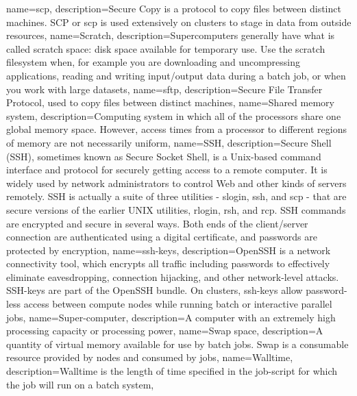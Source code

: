 {
  name={scp},
  description={Secure Copy is a protocol to copy files between distinct machines. SCP or scp is used extensively on \hpc clusters to stage in data from outside resources},
}
{
  name={Scratch},
  description={Supercomputers generally have what is called scratch space: disk space available for temporary use. Use the scratch filesystem when, for example you are downloading and uncompressing applications, reading and writing input/output data during a batch job, or when you work with large datasets},
}
{
  name={sftp},
  description={Secure File Transfer Protocol, used to copy files between distinct machines},
}
{
  name={Shared memory system},
  description={Computing system in which all of the processors share one global memory space. However, access times from a processor to different regions of memory are not necessarily uniform},
}
{
  name={SSH},
  description={Secure Shell (SSH), sometimes known as Secure Socket Shell, is a Unix-based command interface and protocol for securely getting access to a remote computer. It is widely used by network administrators to control Web and other kinds of servers remotely. SSH is actually a suite of three utilities - slogin, ssh, and scp - that are secure versions of the earlier UNIX utilities, rlogin, rsh, and rcp. SSH commands are encrypted and secure in several ways. Both ends of the client/server connection are authenticated using a digital certificate, and passwords are protected by encryption},
}
{
  name={ssh-keys},
  description={OpenSSH is a network connectivity tool, which encrypts all traffic including passwords to effectively eliminate eavesdropping, connection hijacking, and other network-level attacks. SSH-keys are part of the OpenSSH bundle. On \hpc clusters, ssh-keys allow password-less access between compute nodes while running batch or interactive parallel jobs},
}
{
  name={Super-computer},
  description={A computer with an extremely high processing capacity or processing power},
}
{
  name={Swap space},
  description={A quantity of virtual memory available for use by batch jobs. Swap is a consumable resource provided by nodes and consumed by jobs},
}
{
  name={Walltime},
  description={Walltime is the length of time specified in the job-script for which the job will run on a batch system},
}
